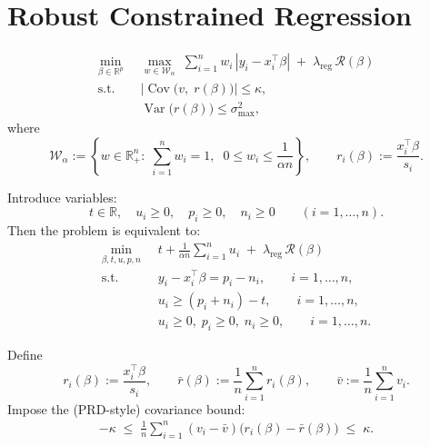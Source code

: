 \documentclass[11pt]{article}
\theoremstyle{plain}
\theoremstyle{definition}
\newcommand{\1}{\mathbf{1}}
\begin{document}
\newpage




\section{Robust Constrained Regression}


\begin{align}
\min_{\beta \in \mathbb{R}^p}\;\; 
&\max_{w \in \mathcal{W}_\alpha}\;\sum_{i=1}^n w_i\,|y_i - x_i^\top \beta|
\;+\;\lambda_{\mathrm{reg}}\,\mathcal{R}(\beta) \\
\text{s.t.}\;\;
&\left|\operatorname{Cov}\big(v,\; r(\beta)\big)\right|\le \kappa, \\
&\operatorname{Var}\big(r(\beta)\big)\le \sigma_{\max}^2,
\end{align}
where
\[
\mathcal{W}_\alpha := \left\{w \in \mathbb{R}^n_+:\; \sum_{i=1}^n w_i = 1,\;\; 0 \le w_i \le \frac{1}{\alpha n}\right\},
\qquad
r_i(\beta) := \frac{x_i^\top \beta}{s_i}.
\]

Introduce variables:
\[
t \in \mathbb{R},\quad
u_i \ge 0,\quad
p_i \ge 0,\quad
n_i \ge 0
\qquad (i=1,\dots,n).
\]
Then the problem is equivalent to:
\begin{align}
\min_{\beta,t,u,p,n}\;\;
& t + \frac{1}{\alpha n}\sum_{i=1}^n u_i \;+\;\lambda_{\mathrm{reg}}\,\mathcal{R}(\beta)
\label{eq:final}\\
\text{s.t.}\;\;
& y_i - x_i^\top \beta = p_i - n_i, \qquad i=1,\dots,n, \label{eq:lad1}\\
& u_i \ge (p_i+n_i) - t, \qquad i=1,\dots,n, \label{eq:cvar1}\\
& u_i \ge 0,\; p_i\ge 0,\; n_i\ge 0, \qquad i=1,\dots,n. \label{eq:nonneg}
\end{align}

Define
\[
r_i(\beta) := \frac{x_i^\top \beta}{s_i},\qquad
\bar r(\beta) := \frac{1}{n}\sum_{i=1}^n r_i(\beta),\qquad
\bar v := \frac{1}{n}\sum_{i=1}^n v_i.
\]
Impose the (PRD-style) covariance bound:
\begin{align}
-\kappa \;\le\; \frac{1}{n}\sum_{i=1}^n (v_i-\bar v)\big(r_i(\beta)-\bar r(\beta)\big)\;\le\;\kappa.
\label{eq:cov}
\end{align}
\end{document}
